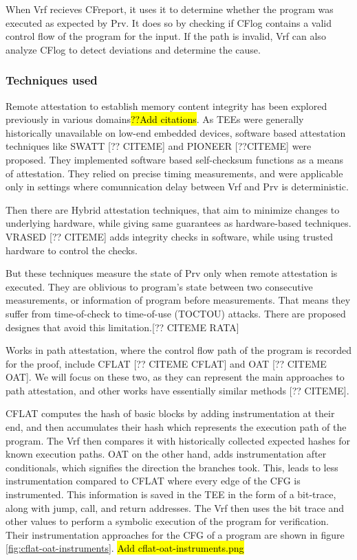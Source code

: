 \documentclass[a4paper, nobind]{templates/ociamthesis}
\begin{document}
When Vrf recieves CFreport, it uses it to determine whether the program was executed as expected by Prv.
It does so by checking if CFlog contains a valid control flow of the program
for the input. If the path is invalid, Vrf can also analyze CFlog to detect
deviations and determine the cause.

\subsubsection{Techniques used}\label{cfatechniques}

Remote attestation to establish memory content integrity has been explored previously
in various domains\hl{??Add citations}.
As TEEs were generally historically unavailable on low-end embedded devices,
software based attestation techniques like SWATT {[}?? CITEME{]} and PIONEER {[}??CITEME{]} were proposed.
They implemented software based self-checksum functions as a means of attestation.
They relied on precise timing measurements, and were applicable only in settings where
comunnication delay between Vrf and Prv is deterministic.

Then there are Hybrid attestation techniques, that aim to minimize changes to
underlying hardware, while giving same guarantees as hardware-based techniques.
VRASED {[}?? CITEME{]} adds integrity checks in software, while using trusted hardware to control the checks.

But these techniques measure the state of Prv only when remote attestation is executed.
They are oblivious to program's state between two consecutive measurements, or
information of program before measurements. That means they suffer from
time-of-check to time-of-use (TOCTOU) attacks. There are proposed designes that avoid this limitation.{[}?? CITEME RATA{]}

Works in path attestation, where the control flow path of the program is recorded
for the proof, include CFLAT {[}?? CITEME CFLAT{]} and OAT {[}?? CITEME OAT{]}.
We will focus on these two, as they can represent the main approaches to path
attestation, and other works have essentially similar methods {[}?? CITEME{]}.

CFLAT computes the hash of basic blocks by adding instrumentation at their end,
and then accumulates their hash which represents the execution path of the program.
The Vrf then compares it with historically collected expected hashes for known
execution paths.
OAT on the other hand, adds instrumentation after conditionals, which signifies
the direction the branches took. This, leads to less instrumentation compared to
CFLAT where every edge of the CFG is instrumented.
This information is saved in the TEE in the form of a bit-trace, along with
jump, call, and return addresses.
The Vrf then uses the bit trace and other values to perform a symbolic execution
of the program for verification.
Their instrumentation approaches for the CFG of a program
are shown in figure \ref{fig:cflat-oat-instruments}.
\hl{Add cflat-oat-instruments.png}
\end{document}
